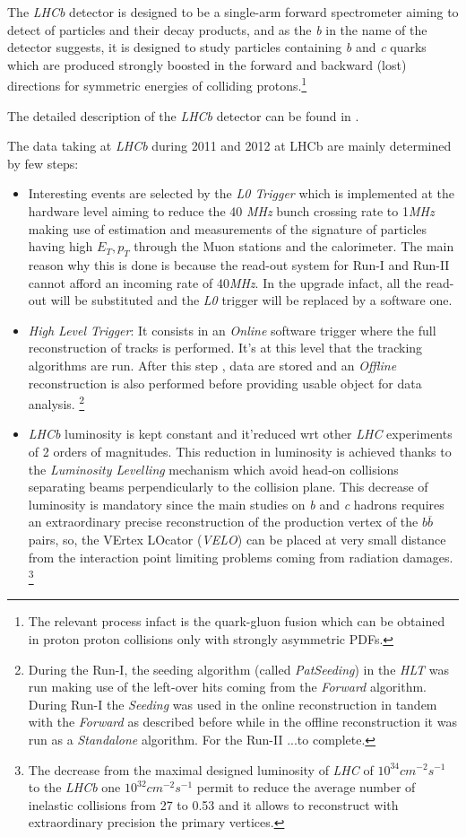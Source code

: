 \documentclass[paper=a4, fontsize=10pt]{scrartcl}
\numberwithin{equation}{section}		%
\numberwithin{figure}{section}			%
\numberwithin{table}{section}				%
\begin{document}
The \textit{LHCb} detector is designed to be a single-arm forward spectrometer aiming to detect of particles and their decay products, and as the \textit{b} in the name of the detector suggests, it is designed to study particles containing \textit{b} and \textit{c} quarks which are produced strongly boosted in the forward and backward (lost)  directions for symmetric energies of colliding protons.\footnote{The relevant process infact is the quark-gluon fusion which can be obtained in proton proton collisions only with strongly asymmetric PDFs.}

The detailed description of the \textit{LHCb} detector can be found in \cite{Blake1}.

The data taking at \textit{LHCb} during 2011 and 2012 at LHCb are mainly determined by few steps:
\begin{itemize}
\item{Interesting events are selected by the \textit{L0 Trigger} which is implemented at the hardware level aiming to reduce the 40 \textit{MHz} bunch crossing rate to 1\textit{MHz} making use of estimation and measurements of the signature of particles having high $E_{T},p_{T}$ through the Muon stations and the calorimeter. The main reason why this is done is because the read-out system for Run-I and Run-II cannot afford an incoming rate of 40\textit{MHz}. In the upgrade infact, all the read-out will be substituted and the \textit{L0} trigger will be replaced by a software one.}
\item{\textit{High Level Trigger}: It consists in an \textit{Online} software trigger where the full reconstruction of tracks is performed. It's at this level that the tracking algorithms are run. After this step , data are stored and an \textit{Offline} reconstruction is also performed before providing usable object for data analysis. \footnote{During the Run-I, the seeding algorithm (called \textit{PatSeeding}) in the \textit{HLT} was run making use of the left-over hits coming from the \textit{Forward} algorithm. During Run-I the \textit{Seeding} was used in the online reconstruction in tandem with the \textit{Forward} as described before while in the offline reconstruction it was run as a \textit{Standalone} algorithm. For the Run-II ...to complete.}}
\item{\textit{LHCb} luminosity is kept constant and it'reduced wrt other \textit{LHC} experiments of 2 orders of magnitudes. This reduction in luminosity is achieved thanks to the \textit{Luminosity Levelling} mechanism which avoid head-on collisions separating beams perpendicularly to the collision plane. This decrease of luminosity is mandatory since the main studies on \textit{b} and \textit{c} hadrons requires an extraordinary precise reconstruction of the production vertex of the $b\overline{b}$ pairs, so, the VErtex LOcator (\textit{VELO}) can be placed at very small distance from the interaction point limiting problems coming from radiation damages. \footnote{The decrease from the maximal designed luminosity of \textit{LHC} of $10^{34}cm^{-2}s^{-1}$ to the \textit{LHCb} one  $10^{32}cm^{-2}s^{-1}$ permit to reduce the average number of inelastic collisions from 27 to 0.53 and it allows to reconstruct with extraordinary precision the primary vertices.} }

\end{itemize}
\end{document}
